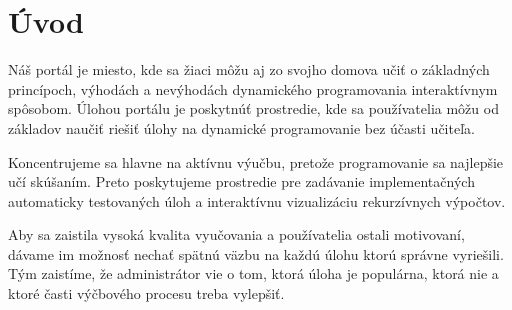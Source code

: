 \chapter*{Úvod}
Náš portál je miesto, kde sa žiaci môžu aj zo svojho domova učiť o základných princípoch,
výhodách a nevýhodách dynamického programovania interaktívnym spôsobom.
Úlohou portálu je poskytnúť prostredie, kde sa používatelia môžu od základov naučiť
riešiť úlohy na dynamické programovanie bez účasti učiteľa.

Koncentrujeme sa hlavne na aktívnu výučbu, pretože programovanie sa najlepšie učí
skúšaním. Preto poskytujeme prostredie pre zadávanie implementačných automaticky
testovaných úloh a interaktívnu vizualizáciu rekurzívnych výpočtov.

Aby sa zaistila vysoká kvalita vyučovania a používatelia ostali motivovaní, dávame
im možnosť nechať spätnú väzbu na každú úlohu ktorú správne vyriešili. Tým zaistíme,
že administrátor vie o tom, ktorá úloha je populárna, ktorá nie a ktoré časti výčbového
procesu treba vylepšiť.
